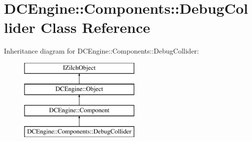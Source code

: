 \hypertarget{classDCEngine_1_1Components_1_1DebugCollider}{\section{D\-C\-Engine\-:\-:Components\-:\-:Debug\-Collider Class Reference}
\label{classDCEngine_1_1Components_1_1DebugCollider}
}
Inheritance diagram for D\-C\-Engine\-:\-:Components\-:\-:Debug\-Collider\-:\begin{figure}[H]
\begin{center}
\leavevmode
\includegraphics[height=4.000000cm]{classDCEngine_1_1Components_1_1DebugCollider}
\end{center}
\end{figure}
